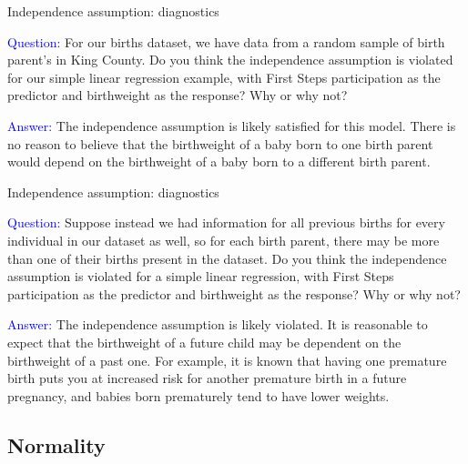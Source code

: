 \documentclass[10pt,t]{beamer}
\begin{document}
\begin{frame}{Independence assumption: diagnostics}


\textcolor{blue}{Question:} For our births dataset, we have data from a random sample of birth parent's in King County. Do you think the independence assumption is violated for our simple linear regression example, with First Steps participation as the predictor and birthweight as the response? Why or why not? \pause

\vspace{0.3cm}

\textcolor{blue}{Answer:} The independence assumption is likely satisfied for this model. There is no reason to believe that the birthweight of a baby born to one birth parent would depend on the birthweight of a baby born to a different birth parent.

\end{frame}

\begin{frame}{Independence assumption: diagnostics}


\textcolor{blue}{Question:} Suppose instead we had information for all previous births for every individual in our dataset as well, so for each birth parent, there may be more than one of their births present in the dataset. Do you think the independence assumption is violated for a simple linear regression, with First Steps participation as the predictor and birthweight as the response? Why or why not? \pause

\vspace{0.3cm}

\textcolor{blue}{Answer:} The independence assumption is likely violated. It is reasonable to expect that the birthweight of a future child may be dependent on the birthweight of a past one. For example, it is known that having one premature birth puts you at increased risk for another premature birth in a future pregnancy, and babies born prematurely tend to have lower weights. 

\end{frame}

\subsection{Normality}
\end{document}
